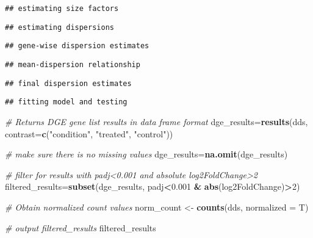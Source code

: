\documentclass[]{article}
\newenvironment{Shaded}{\begin{snugshade}}{\end{snugshade}}
\newcommand{\KeywordTok}[1]{\textcolor[rgb]{0.13,0.29,0.53}{\textbf{#1}}}
\newcommand{\DataTypeTok}[1]{\textcolor[rgb]{0.13,0.29,0.53}{#1}}
\newcommand{\DecValTok}[1]{\textcolor[rgb]{0.00,0.00,0.81}{#1}}
\newcommand{\FloatTok}[1]{\textcolor[rgb]{0.00,0.00,0.81}{#1}}
\newcommand{\StringTok}[1]{\textcolor[rgb]{0.31,0.60,0.02}{#1}}
\newcommand{\CommentTok}[1]{\textcolor[rgb]{0.56,0.35,0.01}{\textit{#1}}}
\newcommand{\OperatorTok}[1]{\textcolor[rgb]{0.81,0.36,0.00}{\textbf{#1}}}
\newcommand{\NormalTok}[1]{#1}
\begin{document}
\begin{verbatim}
## estimating size factors
\end{verbatim}

\begin{verbatim}
## estimating dispersions
\end{verbatim}

\begin{verbatim}
## gene-wise dispersion estimates
\end{verbatim}

\begin{verbatim}
## mean-dispersion relationship
\end{verbatim}

\begin{verbatim}
## final dispersion estimates
\end{verbatim}

\begin{verbatim}
## fitting model and testing
\end{verbatim}

\begin{Shaded}
\begin{Highlighting}[]
\CommentTok{# Returns DGE gene list results in data frame format}
\NormalTok{dge_results=}\KeywordTok{results}\NormalTok{(dds, }\DataTypeTok{contrast=}\KeywordTok{c}\NormalTok{(}\StringTok{"condition"}\NormalTok{, }\StringTok{"treated"}\NormalTok{, }\StringTok{"control"}\NormalTok{))}

\CommentTok{# make sure there is no missing values}
\NormalTok{dge_results=}\KeywordTok{na.omit}\NormalTok{(dge_results)  }

\CommentTok{# filter for results with padj<0.001 and absolute log2FoldChange>2}
\NormalTok{filtered_results=}\KeywordTok{subset}\NormalTok{(dge_results, padj}\OperatorTok{<}\FloatTok{0.001} \OperatorTok{&}\StringTok{ }\KeywordTok{abs}\NormalTok{(log2FoldChange)}\OperatorTok{>}\DecValTok{2}\NormalTok{)}

\CommentTok{# Obtain normalized count values}
\NormalTok{norm_count <-}\StringTok{ }\KeywordTok{counts}\NormalTok{(dds, }\DataTypeTok{normalized =}\NormalTok{ T)}

\CommentTok{# output filtered_results}
\NormalTok{filtered_results}
\end{Highlighting}
\end{Shaded}
\end{document}
